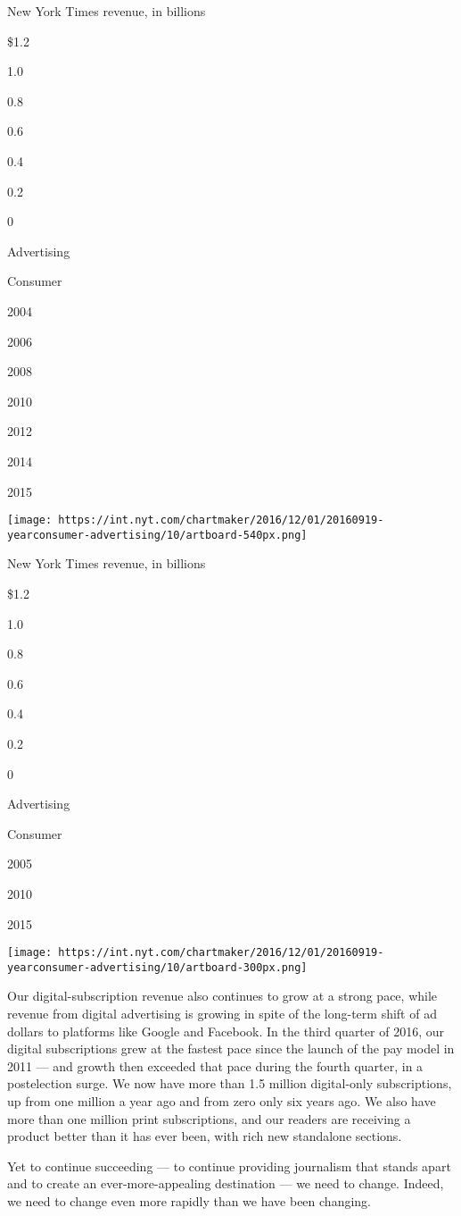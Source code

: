 New York Times revenue, in billions

\$1.2

1.0

0.8

0.6

0.4

0.2

0

Advertising

Consumer

2004

2006

2008

2010

2012

2014

2015

\texttt{[image: https://int.nyt.com/chartmaker/2016/12/01/20160919-yearconsumer-advertising/10/artboard-540px.png]}

New York Times revenue, in billions

\$1.2

1.0

0.8

0.6

0.4

0.2

0

Advertising

Consumer

2005

2010

2015

\texttt{[image: https://int.nyt.com/chartmaker/2016/12/01/20160919-yearconsumer-advertising/10/artboard-300px.png]}

Our digital-subscription revenue also continues to grow at a strong
pace, while revenue from digital advertising is growing in spite of the
long-term shift of ad dollars to platforms like Google and Facebook. In
the third quarter of 2016, our digital subscriptions grew at the fastest
pace since the launch of the pay model in 2011 --- and growth then
exceeded that pace during the fourth quarter, in a postelection surge.
We now have more than 1.5 million digital-only subscriptions, up from
one million a year ago and from zero only six years ago. We also have
more than one million print subscriptions, and our readers are receiving
a product better than it has ever been, with rich new standalone
sections.

Yet to continue succeeding --- to continue providing journalism that
stands apart and to create an ever-more-appealing destination --- we
need to change. Indeed, we need to change even more rapidly than we have
been changing.

